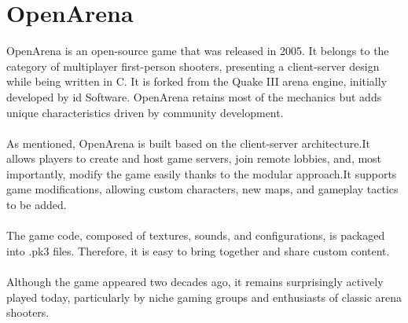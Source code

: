 \section{OpenArena}
\label{sec:openarena}

OpenArena\cite{openarena-news} is an open-source game that was released in 2005.
It belongs to the category of multiplayer first-person shooters, presenting a client-server design while being written in C\cite{openarena-github}.
It is forked from the Quake III arena engine, initially developed by id Software. OpenArena retains most of the mechanics but adds unique characteristics driven by community development. \\ \\
As mentioned, OpenArena is built based on the client-server architecture.\@ It allows players to create and host game servers, join remote lobbies, and, most importantly, modify the game easily
thanks to the modular approach.\@ It supports game modifications, allowing custom characters, new maps, and gameplay tactics to be added. \\ \\
The game code, composed of textures, sounds, and configurations, is packaged into .pk3\cite{doomwiki-pk3} files. Therefore, it is easy to bring together and share custom content. \\ \\
Although the game appeared two decades ago, it remains surprisingly actively played today, particularly by niche gaming groups and enthusiasts of classic arena shooters.
\\
\\